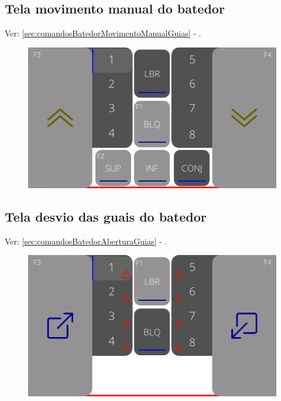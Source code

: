 \subsection{Tela movimento manual do batedor}
    Ver: \ref{sec:comandosBatedorMovimentoManualGuias} - .
\vspace*{\fill}
\begin{figure}[h]
  \centering
  \includegraphics{src/imagesICV/12-KTP400-scout/e-2.png}
\end{figure}
\vspace*{\fill}

\newpage
\thispagestyle{fancy}
\vspace*{40 pt}
\subsection{Tela desvio das guais do batedor}
    Ver: \ref{sec:comandosBatedorAberturaGuias} - .
\vspace*{\fill}
\begin{figure}[h]
  \centering
  \includegraphics{src/imagesICV/12-KTP400-scout/e-3.png}
\end{figure}
\vspace*{\fill}